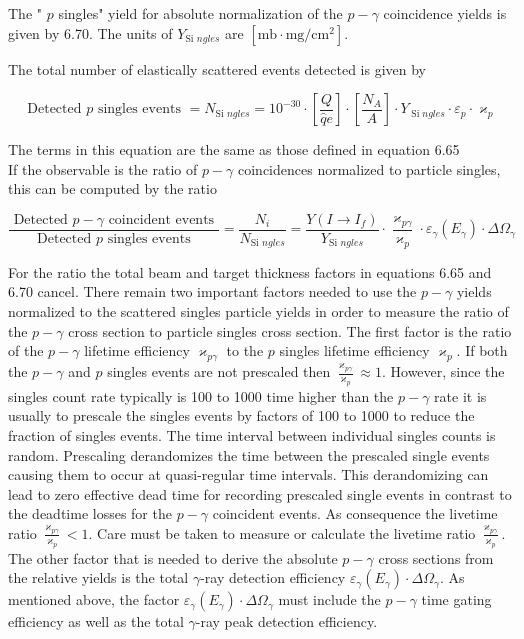 \documentclass[10pt]{article}
\begin{document}
The " $p$ singles" yield for absolute normalization of the $p-\gamma$ coincidence yields is given by 6.70. The units of $Y_{\text {Si } n g l e s}$ are $\left[\mathrm{mb} \cdot \mathrm{mg} / \mathrm{cm}^{2}\right]$.

The total number of elastically scattered events detected is given by


\begin{equation*}
\text { Detected } p \text { singles events }=N_{\text {Si } n g l e s}=10^{-30} \cdot\left[\frac{Q}{\hat{q} e}\right] \cdot\left[\frac{N_{A}}{A}\right] \cdot Y_{\operatorname{Si} n g l e s} \cdot \varepsilon_{p} \cdot \varkappa_{p} \tag{6.70}
\end{equation*}


The terms in this equation are the same as those defined in equation 6.65\\
If the observable is the ratio of $p-\gamma$ coincidences normalized to particle singles, this can be computed by the ratio


\begin{equation*}
\frac{\text { Detected } p-\gamma \text { coincident events }}{\text { Detected } p \text { singles events }}=\frac{N_{i}}{N_{\text {Si } n g l e s}}=\frac{Y\left(I \rightarrow I_{f}\right)}{Y_{\text {Si } n g l e s}} \cdot \frac{\varkappa_{p \gamma}}{\varkappa_{p}} \cdot \varepsilon_{\gamma}\left(E_{\gamma}\right) \cdot \Delta \Omega_{\gamma} \tag{7.3}
\end{equation*}


For the ratio the total beam and target thickness factors in equations 6.65 and 6.70 cancel. There remain two important factors needed to use the $p-\gamma$ yields normalized to the scattered singles particle yields in order to measure the ratio of the $p-\gamma$ cross section to particle singles cross section. The first factor is the ratio of the $p-\gamma$ lifetime efficiency $\varkappa_{p \gamma}$ to the $p$ singles lifetime efficiency $\varkappa_{p}$. If both the $p-\gamma$ and $p$ singles events are not prescaled then $\frac{\varkappa_{p \gamma}}{\varkappa_{p}} \approx 1$. However, since the singles count rate typically is 100 to 1000 time higher than the $p-\gamma$ rate it is usually to prescale the singles events by factors of 100 to 1000 to reduce the fraction of singles events. The time interval between individual singles counts is random. Prescaling derandomizes the time between the prescaled single events causing them to occur at quasi-regular time intervals. This derandomizing can lead to zero effective dead time for recording prescaled single events in contrast to the deadtime losses for the $p-\gamma$ coincident events. As consequence the livetime ratio $\frac{\varkappa_{p \gamma}}{\varkappa_{p}}<1$. Care must be taken to measure or calculate the livetime ratio $\frac{\varkappa_{p \gamma}}{\varkappa_{p}}$. The other factor that is needed to derive the absolute $p-\gamma$ cross sections from the relative yields is the total $\gamma$-ray detection efficiency $\varepsilon_{\gamma}\left(E_{\gamma}\right) \cdot \Delta \Omega_{\gamma}$. As mentioned above, the factor $\varepsilon_{\gamma}\left(E_{\gamma}\right) \cdot \Delta \Omega_{\gamma}$ must include the $p-\gamma$ time gating efficiency as well as the total $\gamma$-ray peak detection efficiency.
\end{document}
